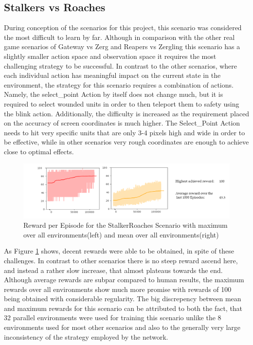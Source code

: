 \subsection{Stalkers vs Roaches}
During conception of the scenarios for this project, this scenario was considered the most difficult to learn by far. Although in comparison with the other real game scenarios of Gateway vs Zerg and Reapers vs Zergling this scenario has a slightly smaller action space and observation space it requires the most challenging strategy to be successful. In contrast to the other scenarios, where each individual action has meaningful impact on the current state in the environment, the strategy for this scenario requires a combination of actions. Namely, the select\_point Action by itself does not change much, but it is required to select wounded units in order to then teleport them to safety using the blink action. Additionally, the difficulty is increased as the requirement placed on the accuracy of screen coordinates is much higher. The Select\_Point Action needs to hit very specific units that are only 3-4 pixels high and wide in order to be effective, while in other scenarios very rough coordinates are enough to achieve close to optimal effects. 

\begin{figure}[htb]
  \centering
      \includegraphics[width=1\textwidth]{Figures/plots/plot_sr_acktr_coord.png}
  \caption{Reward per Episode for the StalkerRoaches Scenario with maximum over all environments(left) and mean over all environments(right)}
  \label{fig:sr_rew}
\end{figure}

As Figure \ref{fig:sr_rew} shows, decent rewards were able to be obtained, in spite of these challenges. In contrast to other scenarios there is no steep reward ascend here, and instead a rather slow increase, that almost plateaus towards the end. Although average rewards are subpar compared to human results, the maximum rewards over all environments show much more promise with rewards of 100 being obtained with considerable regularity. The big discrepency between mean and maximum rewards for this scenario can be attributed to both the fact, that 32 parallel environments were used for training this scenario unlike the 8 environments used for most other scenarios and also to the generally very large inconsistency of the strategy employed by the network. 


